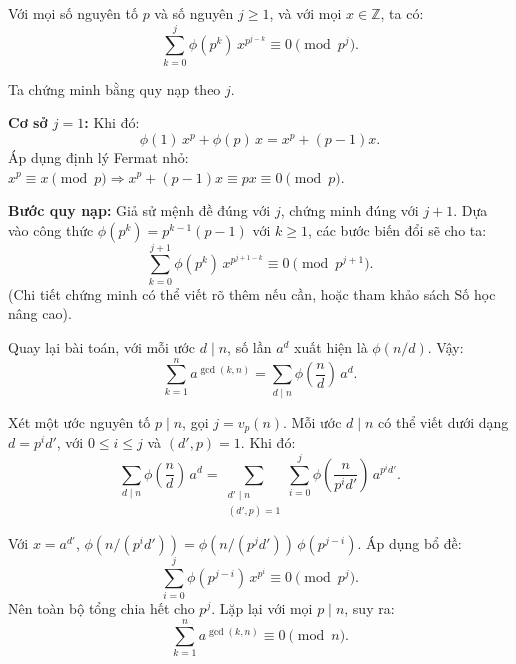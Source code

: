 \documentclass[../05-modular-arithmetic-a.tex]{subfiles}
\begin{document}
\begin{soln}
    \begin{lemma*}
        Với mọi số nguyên tố \( p \) và số nguyên \( j \ge 1 \), và với mọi \( x \in \mathbb{Z} \), ta có:
        \[
            \sum_{k = 0}^{j} \phi\left(p^k\right)\, x^{p^{j - k}} \equiv 0 \pmod{p^j}.
        \]
    \end{lemma*}

    \begin{subproof}
        Ta chứng minh bằng quy nạp theo \( j \).
        
        \textbf{Cơ sở \( j = 1 \):} Khi đó:
        \[
            \phi(1)\,x^p + \phi(p)\,x = x^p + (p - 1)x.
        \]
        Áp dụng định lý Fermat nhỏ: \( x^p \equiv x \pmod{p} \Rightarrow x^p + (p - 1)x \equiv px \equiv 0 \pmod{p} \).

        \textbf{Bước quy nạp:} Giả sử mệnh đề đúng với \( j \), chứng minh đúng với \( j + 1 \).  
        Dựa vào công thức \( \phi(p^k) = p^{k-1}(p - 1) \) với \( k \ge 1 \), các bước biến đổi sẽ cho ta:
        \[
            \sum_{k=0}^{j+1} \phi(p^k)\, x^{p^{j + 1 - k}} \equiv 0 \pmod{p^{j+1}}.
        \]
        (Chi tiết chứng minh có thể viết rõ thêm nếu cần, hoặc tham khảo sách Số học nâng cao).
    \end{subproof}

    Quay lại bài toán, với mỗi ước \( d \mid n \), số lần \( a^d \) xuất hiện là \( \phi(n/d) \). Vậy:
    \[
        \sum_{k=1}^n a^{\gcd(k,n)} = \sum_{d \mid n} \phi\left( \frac{n}{d} \right)\, a^d.
    \]

    Xét một ước nguyên tố \( p \mid n \), gọi \( j = v_p(n) \). Mỗi ước \( d \mid n \) có thể viết dưới dạng \( d = p^i d' \), với \( 0 \le i \le j \) và \( (d', p) = 1 \). Khi đó:
    \[
        \sum_{d \mid n} \phi\left(\frac{n}{d}\right)\, a^d
        = \sum_{\substack{d' \mid n \\ (d',p)=1}} \sum_{i=0}^j \phi\left( \frac{n}{p^i d'} \right)\, a^{p^i d'}.
    \]

    Với \( x = a^{d'} \), \( \phi(n/(p^i d')) = \phi(n/(p^j d'))\, \phi(p^{j - i}) \). Áp dụng bổ đề:
    \[
        \sum_{i = 0}^j \phi(p^{j - i})\, x^{p^i} \equiv 0 \pmod{p^j}.
    \]
    Nên toàn bộ tổng chia hết cho \( p^j \). Lặp lại với mọi \( p \mid n \), suy ra:
    \[
        \sum_{k=1}^n a^{\gcd(k,n)} \equiv 0 \pmod{n}.
    \]
\end{soln}
\end{document}
